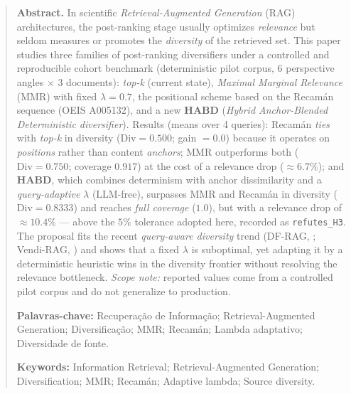 \documentclass[11pt,a4paper]{article}
\newcommand{\Div}{\mathrm{Div}}
\begin{document}
\begin{abstract}
\medskip
\noindent\textbf{Abstract.} In scientific \textit{Retrieval-Augmented Generation}
(RAG) architectures, the post-ranking stage usually optimizes \emph{relevance}
but seldom measures or promotes the \emph{diversity} of the retrieved set. This
paper studies three families of post-ranking diversifiers under a controlled and
reproducible cohort benchmark (deterministic pilot corpus, 6 perspective angles
$\times$ 3 documents): \emph{top-k} (current state), \emph{Maximal Marginal
Relevance} (MMR) with fixed $\lambda{=}0.7$, the positional scheme based on the
Recamán sequence (OEIS A005132), and a new \textbf{HABD} (\emph{Hybrid
Anchor-Blended Deterministic diversifier}). Results (means over 4 queries):
Recamán \emph{ties} with \emph{top-k} in diversity ($\Div{=}0.500$; gain $=0.0$)
because it operates on \emph{positions} rather than content \emph{anchors}; MMR
outperforms both ($\Div{=}0.750$; coverage $0.917$) at the cost of a relevance
drop ($\approx 6.7\%$); and \textbf{HABD}, which combines determinism with anchor
dissimilarity and a \emph{query-adaptive} $\lambda$ (LLM-free), surpasses MMR and
Recamán in diversity ($\Div{=}0.8333$) and reaches \emph{full coverage} ($1.0$),
but with a relevance drop of $\approx 10.4\%$ — above the $5\%$ tolerance
adopted here, recorded as \texttt{refutes\_H3}. The proposal fits the recent
\emph{query-aware diversity} trend (DF-RAG, ;
Vendi-RAG, ) and shows that a fixed $\lambda$ is
suboptimal, yet adapting it by a deterministic heuristic wins in the diversity
frontier without resolving the relevance bottleneck. \emph{Scope note:} reported
values come from a controlled pilot corpus and do not generalize to production.

\medskip
\noindent\textbf{Palavras-chave:} Recuperação de Informação; Retrieval-Augmented
Generation; Diversificação; MMR; Recamán; Lambda adaptativo; Diversidade de fonte.

\noindent\textbf{Keywords:} Information Retrieval; Retrieval-Augmented Generation;
Diversification; MMR; Recamán; Adaptive lambda; Source diversity.
\end{abstract}

\tableofcontents







\end{document}
